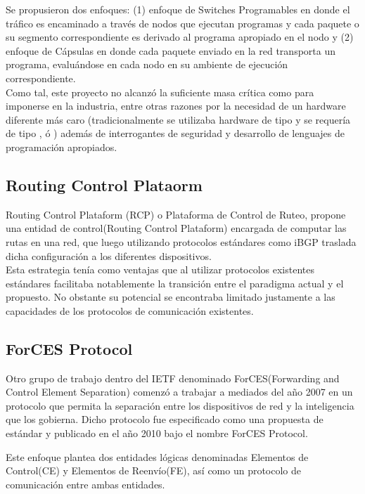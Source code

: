 Se propusieron dos enfoques: (1) enfoque de Switches Programables en donde el tr\'afico es encaminado a través de nodos que ejecutan programas y cada paquete o su segmento correspondiente es derivado al programa apropiado en el nodo y (2) enfoque de C\'apsulas en donde cada paquete enviado en la red transporta un programa, evaluándose en cada nodo en su ambiente de ejecución correspondiente.\\

Como tal, este proyecto no alcanz\'o la suficiente masa cr\'itica como para imponerse en la industria, entre otras razones por la necesidad de un hardware diferente m\'as caro (tradicionalmente se utilizaba hardware de tipo  y se requería de tipo ,  \'o ) adem\'as de interrogantes de seguridad y desarrollo de lenguajes de programación apropiados.

\subsection{Routing Control Plataorm}
Routing Control Plataform (RCP)\citep{feamster2004case}\citep{caesar2005design} o Plataforma de Control de Ruteo, propone una entidad de control(Routing Control Plataform) encargada de computar las rutas en una red, que luego utilizando protocolos estándares como iBGP traslada dicha configuración a los diferentes dispositivos.\\ 

Esta estrategia ten\'ia como ventajas que al utilizar protocolos existentes estándares facilitaba notablemente la transición entre el paradigma actual y el propuesto. No obstante su potencial 
se encontraba limitado justamente a las capacidades de los protocolos de comunicación existentes.

\subsection{ForCES Protocol}
Otro grupo de trabajo dentro del IETF denominado ForCES(Forwarding and Control Element Separation) comenzó a trabajar a mediados del año 2007 en un protocolo que permita la separación entre los dispositivos de red y la inteligencia que los gobierna. Dicho protocolo fue especificado como una propuesta de estándar y publicado en el año 2010 bajo el nombre ForCES Protocol\citep{doria2010forwarding}.

Este enfoque plantea dos entidades lógicas denominadas Elementos de Control(CE) y Elementos de Reenv\'io(FE), así como un protocolo de comunicación entre ambas entidades.


